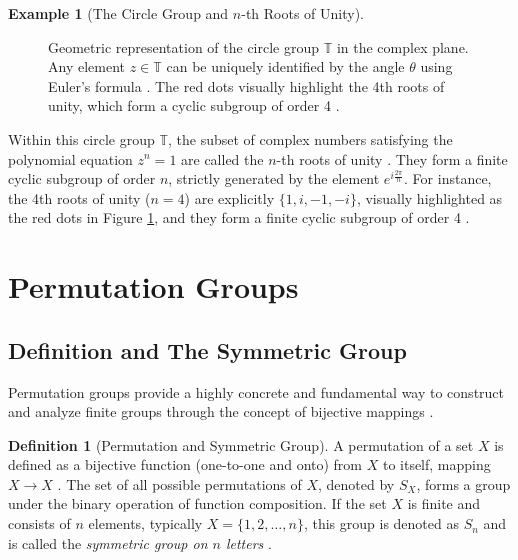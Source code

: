 \documentclass[11pt]{article}
\theoremstyle{definition}
\newtheorem{definition}{Definition}[section]
\newtheorem{example}{Example}[section]
\theoremstyle{plain}
\theoremstyle{remark}
\begin{document}
\begin{example}[The Circle Group and $n$-th Roots of Unity]
\begin{figure}[htbp]
    \caption{Geometric representation of the circle group $\mathbb{T}$ in the complex plane. Any element $z \in \mathbb{T}$ can be uniquely identified by the angle $\theta$ using Euler's formula \cite{dummit}. The red dots visually highlight the 4th roots of unity, which form a cyclic subgroup of order 4 \cite{gallian}.}
    \label{fig:circle_group}
\end{figure}

Within this circle group $\mathbb{T}$, the subset of complex numbers satisfying the polynomial equation $z^n = 1$ are called the $n$-th roots of unity \cite{dummit}. They form a finite cyclic subgroup of order $n$, strictly generated by the element $e^{i\frac{2\pi}{n}}$. 
For instance, the 4th roots of unity ($n=4$) are explicitly $\{1, i, -1, -i\}$, visually highlighted as the red dots in Figure \ref{fig:circle_group}, and they form a finite cyclic subgroup of order 4 \cite{gallian}.
\end{example}



\section{Permutation Groups}

\subsection{Definition and The Symmetric Group}

Permutation groups provide a highly concrete and fundamental way to construct and analyze finite groups through the concept of bijective mappings \cite{fraleigh}.

\begin{definition}[Permutation and Symmetric Group]
A permutation of a set $X$ is defined as a bijective function (one-to-one and onto) from $X$ to itself, mapping $X \rightarrow X$ \cite{dummit}. 
The set of all possible permutations of $X$, denoted by $S_X$, forms a group under the binary operation of function composition. If the set $X$ is finite and consists of $n$ elements, typically $X = \{1, 2, \dots, n\}$, this group is denoted as $S_n$ and is called the \emph{symmetric group on $n$ letters} \cite{gallian}.
\end{definition}
\end{document}
